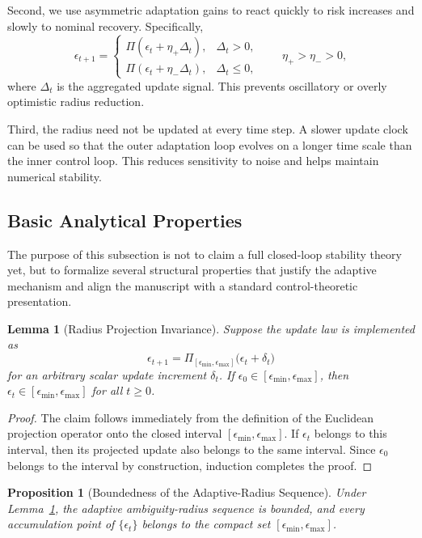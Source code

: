 \documentclass[conference]{IEEEtran}
\newtheorem{lemma}{Lemma}
\newtheorem{proposition}{Proposition}
\begin{document}
Second, we use asymmetric adaptation gains to react quickly to risk increases and slowly to nominal recovery. Specifically,
\begin{equation}
\epsilon_{t+1}=
\begin{cases}
\Pi(\epsilon_t + \eta_{+} \Delta_t), & \Delta_t > 0, \\
\Pi(\epsilon_t + \eta_{-} \Delta_t), & \Delta_t \le 0,
\end{cases}
\qquad \eta_{+} > \eta_{-} > 0,
\end{equation}
where $\Delta_t$ is the aggregated update signal. This prevents oscillatory or overly optimistic radius reduction.

Third, the radius need not be updated at every time step. A slower update clock can be used so that the outer adaptation loop evolves on a longer time scale than the inner control loop. This reduces sensitivity to noise and helps maintain numerical stability.

\subsection{Basic Analytical Properties}
The purpose of this subsection is not to claim a full closed-loop stability theory yet, but to formalize several structural properties that justify the adaptive mechanism and align the manuscript with a standard control-theoretic presentation.

\begin{lemma}[Radius Projection Invariance]
\label{lem:invariance}
Suppose the update law is implemented as
\begin{equation}
\epsilon_{t+1}
=
\Pi_{[\epsilon_{\min},\epsilon_{\max}]}
\big(\epsilon_t + \delta_t\big)
\end{equation}
for an arbitrary scalar update increment $\delta_t$. If $\epsilon_0 \in [\epsilon_{\min},\epsilon_{\max}]$, then $\epsilon_t \in [\epsilon_{\min},\epsilon_{\max}]$ for all $t \ge 0$.
\end{lemma}

\begin{proof}
The claim follows immediately from the definition of the Euclidean projection operator onto the closed interval $[\epsilon_{\min},\epsilon_{\max}]$. If $\epsilon_t$ belongs to this interval, then its projected update also belongs to the same interval. Since $\epsilon_0$ belongs to the interval by construction, induction completes the proof.
\end{proof}

\begin{proposition}[Boundedness of the Adaptive-Radius Sequence]
\label{prop:bounded}
Under Lemma~\ref{lem:invariance}, the adaptive ambiguity-radius sequence is bounded, and every accumulation point of $\{\epsilon_t\}$ belongs to the compact set $[\epsilon_{\min},\epsilon_{\max}]$.
\end{proposition}
\end{document}
